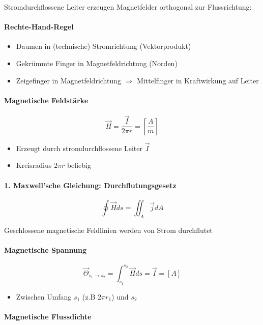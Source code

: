 Stromdurchflossene Leiter erzeugen Magnetfelder orthogonal zur Flussrichtung:

\paragraph{Rechte-Hand-Regel}

\begin{itemize}
  \item Daumen in (technische) Stromrichtung (Vektorprodukt)
  \item Gekrümmte Finger in Magnetfeldrichtung (Norden)
  \item Zeigefinger in Magnetfeldrichtung $\Rightarrow$ Mittelfinger in Kraftwirkung auf Leiter
\end{itemize}

\paragraph{Magnetische Feldstärke}

$$\vec{H} = \frac{\vec{I}}{2\pi r} = \left[\frac{A}{m}\right]$$

\begin{itemize}
  \item Erzeugt durch stromdurchflossene Leiter $\vec{I}$
  \item Kreisradius $2\pi r$ beliebig
\end{itemize}

\paragraph{1. Maxwell'sche Gleichung: Durchflutungsgesetz}

$$\oint \vec{H} ds = \iint_A \vec{j} dA$$

Geschlossene magnetische Feldlinien werden von Strom durchflutet

\paragraph{Magnetische Spannung}

$$\vec{\Theta}_{s_1 \rightarrow s_2} = \int_{s_1}^{s_2} \vec{H} ds = \vec{I} = [A]$$

\begin{itemize}
  \item Zwischen Umfang $s_1$ (z.B $2\pi r_1$) und $s_2$
\end{itemize}

\paragraph{Magnetische Flussdichte}

